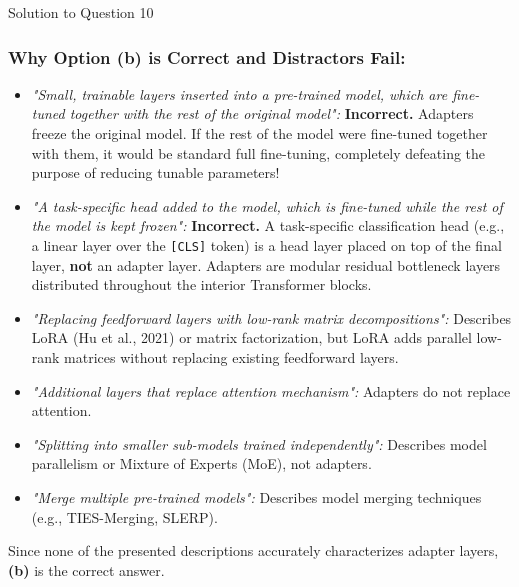 \documentclass[11pt,a4paper]{article}
\begin{document}
\begin{solutionbox}{Solution to Question 10}
\subsubsection*{Why Option (b) is Correct and Distractors Fail:}
\begin{itemize}[leftmargin=1.5cm]
    \item[\textbf{(d)}] \textit{"Small, trainable layers inserted into a pre-trained model, which are fine-tuned together with the rest of the original model":} \textbf{Incorrect.} Adapters freeze the original model. If the rest of the model were fine-tuned together with them, it would be standard full fine-tuning, completely defeating the purpose of reducing tunable parameters!
    \item[\textbf{(g)}] \textit{"A task-specific head added to the model, which is fine-tuned while the rest of the model is kept frozen":} \textbf{Incorrect.} A task-specific classification head (e.g., a linear layer over the \texttt{[CLS]} token) is a head layer placed on top of the final layer, \textbf{not} an adapter layer. Adapters are modular residual bottleneck layers distributed throughout the interior Transformer blocks.
    \item[\textbf{(a)}] \textit{"Replacing feedforward layers with low-rank matrix decompositions":} Describes LoRA (Hu et al., 2021) or matrix factorization, but LoRA adds parallel low-rank matrices without replacing existing feedforward layers.
    \item[\textbf{(c)}] \textit{"Additional layers that replace attention mechanism":} Adapters do not replace attention.
    \item[\textbf{(e)}] \textit{"Splitting into smaller sub-models trained independently":} Describes model parallelism or Mixture of Experts (MoE), not adapters.
    \item[\textbf{(f)}] \textit{"Merge multiple pre-trained models":} Describes model merging techniques (e.g., TIES-Merging, SLERP).
\end{itemize}
Since none of the presented descriptions accurately characterizes adapter layers, \textbf{(b)} is the correct answer.
\end{solutionbox}

\bigskip
\end{document}
